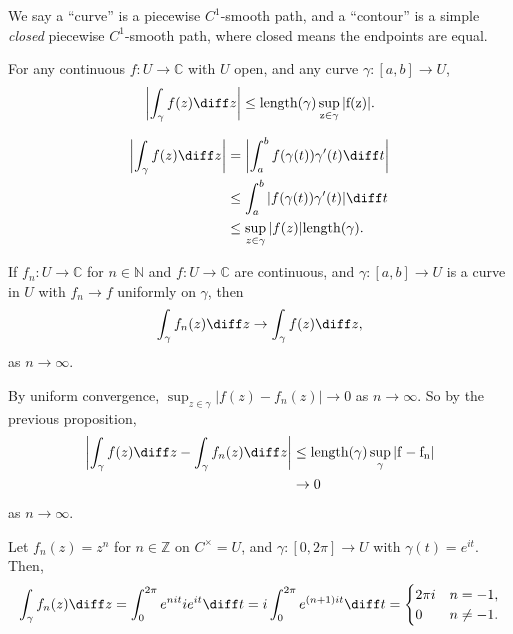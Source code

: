 \documentclass[12pt]{article}
\begin{document}
We say a ``curve'' is a piecewise $C^{1}$-smooth path, and a ``contour'' is a simple \emph{closed} piecewise $C^{1}$-smooth path, where closed means the endpoints are equal.

\begin{proposition}
	For any continuous $f : U \to \mathbb{C}$ with $U$ open, and any curve $\gamma : [a, b] \to U$,
	\[
		\biggl| \int_{\gamma}f(z) \diff z \biggr| \leq \rm{length}(\gamma) \sup_{z \in \gamma}|f(z)|
	.\]
\end{proposition}

\begin{proofbox}
	
	\begin{align*}
		\biggl| \int_{\gamma}f(z) \diff z \biggr| &= \biggl| \int_{a}^{b} f(\gamma(t)) \gamma'(t) \diff t \biggr| \\
							  &\leq \int_{a}^{b} |f(\gamma(t)) \gamma'(t)| \diff t \\
							  &\leq \sup_{z \in \gamma}|f(z)| \rm{length}(\gamma).
	\end{align*}
\end{proofbox}

\begin{proposition}
	If $f_n : U \to \mathbb{C}$ for $n \in \mathbb{N}$ and $f : U \to \mathbb{C}$ are continuous, and $\gamma : [a, b] \to U$ is a curve in $U$ with $f_n \to f$ uniformly on $\gamma$, then
	\[
	\int_{\gamma}f_n(z) \diff z \to \int_{\gamma}f(z) \diff z
	,\]
	as $n \to \infty$.
\end{proposition}

\begin{proofbox}
	By uniform convergence, $\sup_{z \in \gamma}|f(z) - f_n(z)| \to 0$ as $n \to \infty$. So by the previous proposition,
	\begin{align*}
		\biggl| \int_{\gamma}f(z) \diff z - \int_{\gamma}f_n(z) \diff z \biggr| &\leq \rm{length}(\gamma) \sup_{\gamma}|f - f_n| \\
											&\to 0
	\end{align*}
	as $n \to \infty$.
\end{proofbox}

\begin{exbox}
	Let $f_n(z) = z^{n}$ for $n \in \mathbb{Z}$ on $C^{\times} = U$, and $\gamma : [0, 2\pi] \to U$ with $\gamma(t) = e^{it}$. Then,
	\[
	\int_{\gamma}f_n(z) \diff z = \int_{0}^{2\pi} e^{n i t} i e^{it} \diff t = i \int_{0}^{2\pi} e^{(n+1)it} \diff t =
	\begin{cases}
		2 \pi i & n = -1, \\
		0 & n \neq -1.
	\end{cases}
	\]
\end{exbox}


\newpage

\printindex
\end{document}
